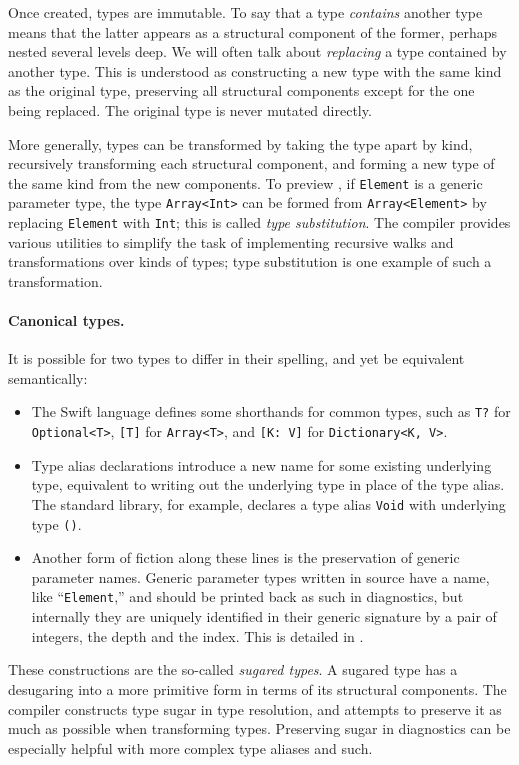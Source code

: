 \documentclass[../generics]{subfiles}
\begin{document}
Once created, types are immutable. To say that a type \emph{contains} another type means that the latter appears as a structural component of the former, perhaps nested several levels deep.  We will often talk about \emph{replacing} a type contained by another type. This is understood as constructing a new type with the same kind as the original type, preserving all structural components except for the one being replaced. The original type is never mutated directly.

More generally, types can be transformed by taking the type apart by kind, recursively transforming each structural component, and forming a new type of the same kind from the new components. To preview , if \texttt{Element} is a generic parameter type, the type \texttt{Array<Int>} can be formed from \texttt{Array<Element>} by replacing \texttt{Element} with \texttt{Int}; this is called \emph{type substitution}. The compiler provides various utilities to simplify the task of implementing recursive walks and transformations over kinds of types; type substitution is one example of such a transformation.

\paragraph{Canonical types.} It is possible for two types to differ in their spelling, and yet be equivalent semantically:
\begin{itemize}
\item The Swift language defines some shorthands for common types, such as \texttt{T?} for \texttt{Optional<T>}, \texttt{[T]} for \texttt{Array<T>}, and \texttt{[K:\ V]} for \texttt{Dictionary<K, V>}.
\item {}Type alias declarations introduce a new name for some existing underlying type, equivalent to writing out the underlying type in place of the type alias. The standard library, for example, declares a type alias \texttt{Void} with underlying type \texttt{()}.
\item Another form of fiction along these lines is the preservation of generic parameter names. Generic parameter types written in source have a name, like ``\texttt{Element},'' and should be printed back as such in diagnostics, but internally they are uniquely identified in their generic signature by a pair of integers, the depth and the index. This is detailed in .
\end{itemize}
These constructions are the so-called \emph{sugared types}. A sugared type has a desugaring into a more primitive form in terms of its structural components. The compiler constructs type sugar in type resolution, and attempts to preserve it as much as possible when transforming types. Preserving sugar in diagnostics can be especially helpful with more complex type aliases and such.
\end{document}
